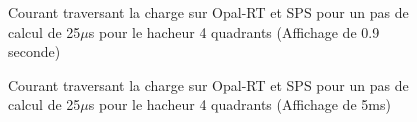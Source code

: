  \begin{figure}[htb]
 \centering
 \caption{Courant traversant la charge sur Opal-RT et SPS pour un pas de calcul de 25$\mu$s pour le hacheur 4 quadrants (Affichage de 0.9 seconde)}
 \label{DC_ch_H4Q_1}
 \end{figure}

  \begin{figure}[htb]
 \centering
 \caption{Courant traversant la charge sur Opal-RT et SPS pour un pas de calcul de 25$\mu$s pour le hacheur 4 quadrants (Affichage de 5ms)}
 \label{DC_ch_H4Q_2}
 \end{figure}





